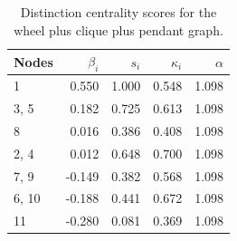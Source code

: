 \begin{table}
\centering
\caption{\label{tab:wcp3}Distinction centrality scores for the wheel plus clique plus pendant graph.}
\centering
\begin{tabular}[t]{lrrrr}
\toprule
Nodes & $\beta_i$ & $s_i$ & $\kappa_i$ & $\alpha$\\
\midrule
1 & 0.550 & 1.000 & 0.548 & 1.098\\
3, 5 & 0.182 & 0.725 & 0.613 & 1.098\\
8 & 0.016 & 0.386 & 0.408 & 1.098\\
2, 4 & 0.012 & 0.648 & 0.700 & 1.098\\
7, 9 & -0.149 & 0.382 & 0.568 & 1.098\\
6, 10 & -0.188 & 0.441 & 0.672 & 1.098\\
11 & -0.280 & 0.081 & 0.369 & 1.098\\
\bottomrule
\end{tabular}
\end{table}
